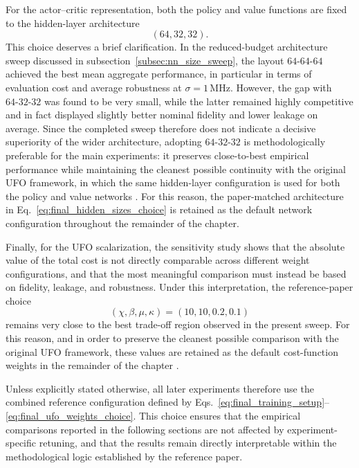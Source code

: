 For the actor--critic representation, both the policy and value functions are fixed to the hidden-layer architecture
\begin{equation}
(64,32,32).
\label{eq:final_hidden_sizes_choice}
\end{equation}
This choice deserves a brief clarification. In the reduced-budget architecture sweep discussed in subsection~\ref{subsec:nn_size_sweep}, the layout \(64\text{-}64\text{-}64\) achieved the best mean aggregate performance, in particular in terms of evaluation cost and average robustness at \(\sigma=1\,\mathrm{MHz}\). However, the gap with \(64\text{-}32\text{-}32\) was found to be very small, while the latter remained highly competitive and in fact displayed slightly better nominal fidelity and lower leakage on average. Since the completed sweep therefore does not indicate a decisive superiority of the wider architecture, adopting \(64\text{-}32\text{-}32\) is methodologically preferable for the main experiments: it preserves close-to-best empirical performance while maintaining the cleanest possible continuity with the original UFO framework, in which the same hidden-layer configuration is used for both the policy and value networks \cite{Niu2019}. For this reason, the paper-matched architecture in Eq.~\eqref{eq:final_hidden_sizes_choice} is retained as the default network configuration throughout the remainder of the chapter.

Finally, for the UFO scalarization, the sensitivity study shows that the absolute value of the total cost is not directly comparable across different weight configurations, and that the most meaningful comparison must instead be based on fidelity, leakage, and robustness. Under this interpretation, the reference-paper choice
\begin{equation}
(\chi,\beta,\mu,\kappa)=(10,10,0.2,0.1)
\label{eq:final_ufo_weights_choice}
\end{equation}
remains very close to the best trade-off region observed in the present sweep. For this reason, and in order to preserve the cleanest possible comparison with the original UFO framework, these values are retained as the default cost-function weights in the remainder of the chapter \cite{Niu2019}.

Unless explicitly stated otherwise, all later experiments therefore use the combined reference configuration defined by
Eqs.~\eqref{eq:final_training_setup}--\eqref{eq:final_ufo_weights_choice}. This choice ensures that the empirical comparisons reported in the following sections are not affected by experiment-specific retuning, and that the results remain directly interpretable within the methodological logic established by the reference paper.

